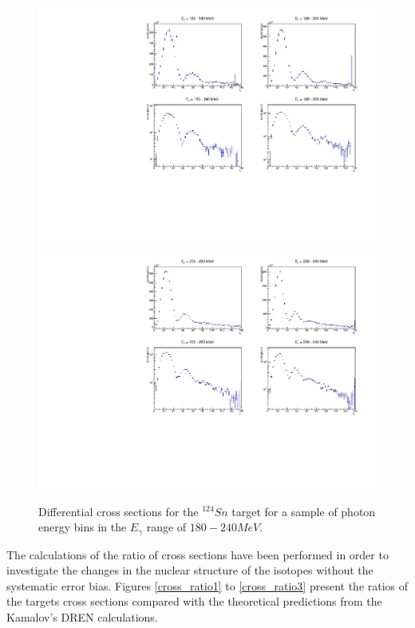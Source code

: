 \begin{figure}[H]
\begin{center}
\includegraphics[scale=0.55]{pictures/pdf/sn124_cross_section_1.pdf}
\includegraphics[scale=0.55]{pictures/pdf/sn124_cross_section_2.pdf}
\caption{Differential cross sections for the $^{124}Sn$ target for a sample of photon energy bins in the $E_{\gamma}$ range of $180 - 240 MeV$.}
\label{cross_section3}
\end{center}
\end{figure}

\indent The calculations of the ratio of cross sections have been performed in order to investigate the changes in the nuclear structure of the isotopes without the systematic error bias. Figures \ref{cross_ratio1} to \ref{cross_ratio3} present the ratios of the targets cross sections compared with the theoretical predictions from the Kamalov's DREN calculations.

